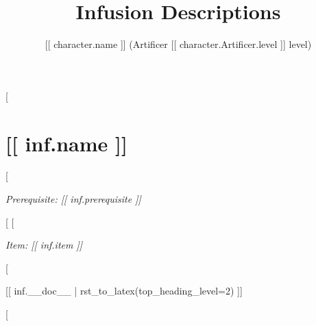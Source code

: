 \documentclass[10pt,twocolumn,lettersize]{article}
\title{Infusion Descriptions}
\author{[[ character.name ]] (Artificer [[ character.Artificer.level ]] level)}
\date{}
\begin{document}
\maketitle

[%

  \section*{[[ inf.name ]]}

  [%

		\noindent
    \textit{Prerequisite: [[ inf.prerequisite ]]}%

  [%
  [%

    \noindent
    \textit{Item: [[ inf.item ]]}%

  [%

  [[ inf.__doc__ | rst_to_latex(top_heading_level=2) ]]

[%
\end{document}
